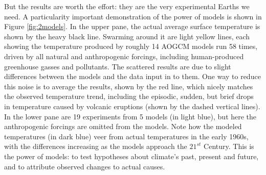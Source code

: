 \documentclass[amstex,12pt]{book}
\begin{document}
But the results are worth the effort: they are the very experimental Earths we need. A particularity important demonstration of the power of models is shown in Figure \ref{fig:2models}. In the upper pane, the actual average surface temperature is shown by the heavy black line. Swarming around it are light yellow lines, each showing the temperature produced by roughly 14 AOGCM models run 58 times, driven by all natural and anthropogenic forcings, including human-produced greenhouse gasses and pollutants. The scattered results are due to slight differences between the models and the data input in to them. One way to reduce this noise is to average the results, shown by the red line, which nicely matches the observed temperature trend, including the episodic, sudden, but brief drops in temperature caused by volcanic eruptions (shown by the dashed vertical lines). In the lower pane are 19 experiments from 5 models (in light blue), but here the anthropogenic forcings are omitted from the models. Note how the modeled temperatures (in dark blue) veer from actual temperatures in the early 1960s, with the differences increasing as the models approach the $21^{st}$ Century. This is the power of models: to test hypotheses about climate's past, present and future, and to attribute observed changes to actual causes.        
\end{document}
